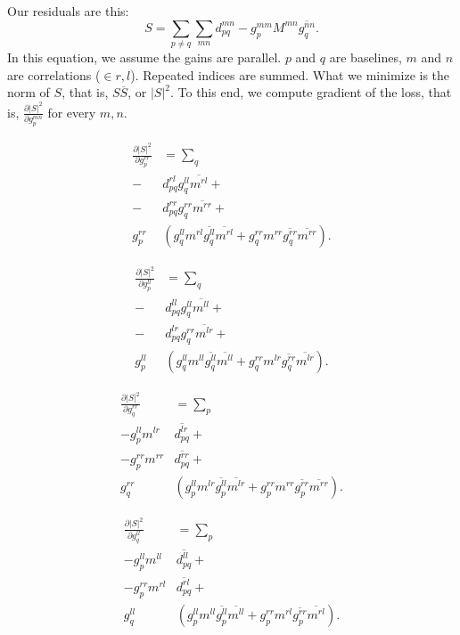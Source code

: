 \documentclass[12pt]{article}
\begin{document}
\par Our residuals are this:
\begin{equation}
S = \sum_{p\neq q} \sum_{mn} d_{pq}^{mn} - g_p^{mm} M^{mn} \overline{g_q^{nn}}.
\end{equation}
In this equation, we assume the gains are parallel.
$p$ and $q$ are baselines, $m$ and $n$ are correlations ($\in {r,l}$). Repeated indices are summed. 
What we minimize is the norm of $S$, that is, $S\overline{S}$, or $|S|^2$.
To this end, we compute gradient of the loss, that is, $\frac{\partial |S|^2}{\partial g_p^{mn}}$ for every $m,n$. 

\begin{equation}
\begin{split}
\frac{\partial |S|^2}{\partial g_p^{rr}} &= \sum_q \\ 
	- &d_{pq}^{rl} g_q^{ll} \overline{m^{rl}}+\\
	- &d_{pq}^{rr} g_q^{rr} \overline{m^{rr}}+\\
	g_p^{rr} &\left(g_q^{ll} m^{rl} \overline{g_q^{ll}} \overline{m^{rl}} + g_q^{rr} m^{rr} \overline{g_q^{rr}} \overline{m^{rr}}\right).
\end{split}
\end{equation}

\begin{equation}
\begin{split}
\frac{\partial |S|^2}{\partial g_p^{ll}} &= \sum_q \\ 
	- &d_{pq}^{ll} g_q^{ll} \overline{m^{ll}}+\\
	- &d_{pq}^{lr} g_q^{rr} \overline{m^{lr}}+\\
	g_p^{ll} &\left(g_q^{ll} m^{ll} \overline{g_q^{ll}} \overline{m^{ll}} + g_q^{rr} m^{lr} \overline{g_q^{rr}} \overline{m^{lr}}\right).
\end{split}
\end{equation}

\begin{equation}
\begin{split}
\frac{\partial |S|^2}{\partial g_q^{rr}} &= \sum_p \\ 
	- g_p^{ll} m^{lr} &\overline{d_{pq}^{lr}}+\\
	- g_p^{rr} m^{rr} &\overline{d_{pq}^{rr}}+\\
	g_q^{rr} &\left(g_p^{ll} m^{lr} \overline{g_p^{ll}} \overline{m^{lr}} + g_p^{rr} m^{rr} \overline{g_p^{rr}} \overline{m^{rr}}\right).
\end{split}
\end{equation}

\begin{equation}
\begin{split}
\frac{\partial |S|^2}{\partial g_q^{ll}} &= \sum_p \\ 
	- g_p^{ll} m^{ll} &\overline{d_{pq}^{ll}}+\\
	- g_p^{rr} m^{rl} &\overline{d_{pq}^{rl}}+\\
	g_q^{ll} &\left(g_p^{ll} m^{ll} \overline{g_p^{ll}} \overline{m^{ll}} + g_p^{rr} m^{rl} \overline{g_p^{rr}} \overline{m^{rl}}\right).
\end{split}
\end{equation}
\end{document}
